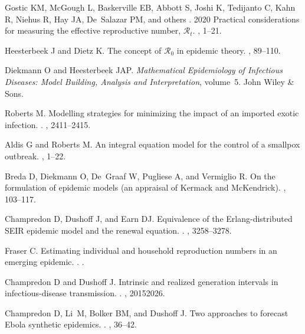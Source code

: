\documentclass[12pt]{article}
\begin{document}
\begin{thebibliography}{10}
Gostic KM, McGough L, Baskerville EB, Abbott S, Joshi K, Tedijanto C, Kahn R,
  Niehus R, Hay JA, De~Salazar PM, and others .
 2020 Practical considerations for measuring the effective
  reproductive number, $\mathcal{R}_t$.
, 1--21.

Heesterbeek J and Dietz K.
 The concept of $\mathcal{R}_0$ in epidemic theory.
, 89--110.

Diekmann O and Heesterbeek JAP.
 {\em Mathematical Epidemiology of Infectious Diseases: Model
  Building, Analysis and Interpretation}, volume~5.
\newblock John Wiley \& Sons.

Roberts M.
 Modelling strategies for minimizing the impact of an imported
  exotic infection.
.
, 2411--2415.

Aldis G and Roberts M.
 An integral equation model for the control of a smallpox
  outbreak.
, 1--22.

Breda D, Diekmann O, De~Graaf W, Pugliese A, and Vermiglio R.
 {On the formulation of epidemic models (an appraisal of Kermack
  and McKendrick)}.
, 103--117.

Champredon D, Dushoff J, and Earn DJ.
 Equivalence of the {Erlang}-distributed {SEIR} epidemic model
  and the renewal equation.
.
, 3258--3278.

Fraser C.
 Estimating individual and household reproduction numbers in an
  emerging epidemic.
.
.

Champredon D and Dushoff J.
 Intrinsic and realized generation intervals in
  infectious-disease transmission.
.
, 20152026.

Champredon D, Li~M, Bolker BM, and Dushoff J.
 Two approaches to forecast {Ebola} synthetic epidemics.
.
, 36--42.


\end{thebibliography}
\end{document}
